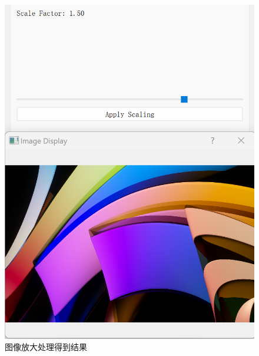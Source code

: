 \documentclass[a4paper,12pt]{article}
\begin{document}
\begin{figure}
\begin{minipage}[b]{0.48\textwidth}
        \includegraphics[width=\linewidth]{images/Design/image_processing/4/transformation2.png}
        \caption{图像放大处理得到结果}
    \end{minipage}
    
    \vspace{0.2cm}
    

\end{figure}
\end{document}
